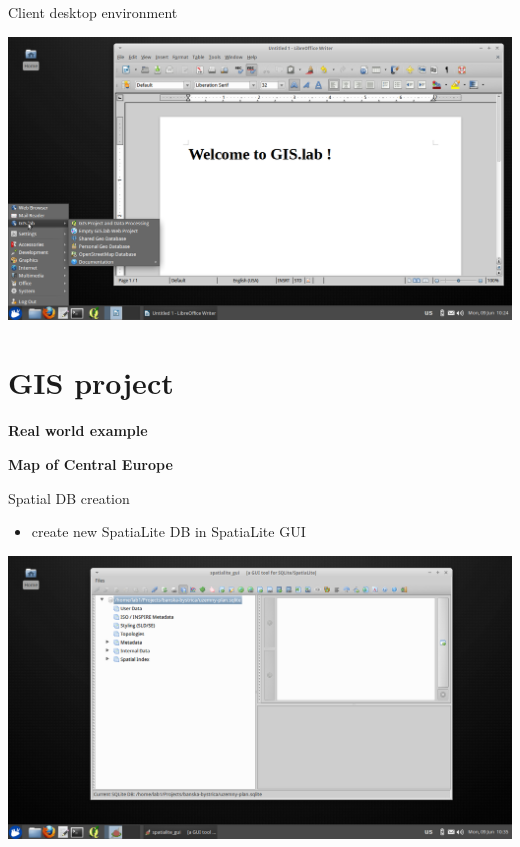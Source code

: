 \documentclass[12pt]{beamer}
\begin{document}
\begin{frame}{Client desktop environment}
	\begin{center}
		\includegraphics[keepaspectratio=true,height=0.7\textheight]{images/real-world-example/client-desktop-libreoffice.png}
	\end{center}
\end{frame}


\section{GIS project}
\begin{frame}
	\begin{center}
		\LARGE\textbf{Real world example}\normalsize

		\textbf{Map of Central Europe}
	\end{center}
\end{frame}


\begin{frame}{Spatial DB creation}
	\begin{itemize}
		\item create new SpatiaLite DB in SpatiaLite GUI
	\end{itemize}
	\begin{center}
		\includegraphics[keepaspectratio=true,height=0.7\textheight]{images/real-world-example/project-create-db.png}
	\end{center}
\end{frame}
\end{document}
